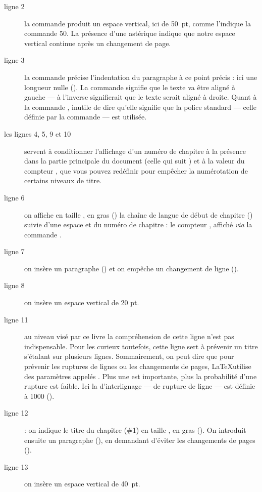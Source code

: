 \begin{description}
\item[ligne 2]la commande   produit un espace vertical, ici de 50~pt, comme l'indique la commande 50. La présence d'une astérique indique que notre espace vertical continue après un changement de page.
\item[ligne 3]la commande  précise l'indentation du paragraphe à ce point précis : ici une longueur nulle (). La commande  signifie que le texte va être aligné à gauche --- à l'inverse  signifierait que le texte serait aligné à droite. Quant à la commande , inutile de dire qu'elle signifie que la police standard --- celle définie par la commande  --- est utilisée.
\item[les lignes 4, 5, 9 et 10] servent à conditionner l'affichage d'un numéro de chapitre à la présence dans la partie principale du document (celle qui suit ) et à la valeur du compteur , que vous pouvez redéfinir pour empêcher la numérotation de certains niveaux de titre.
\item[ligne 6] on affiche en taille , en gras () la chaîne de langue de début de chapitre () suivie d'une espace et du numéro de chapitre : le compteur , affiché \emph{via} la commande .
\item[ligne 7] on insère un paragraphe () et on empêche un changement de ligne ().
\item[ligne 8] on insère un espace vertical de 20 pt.
\item[ligne 11] au niveau visé par ce livre la compréhension de cette ligne n'est pas indispensable. Pour les curieux toutefois, cette ligne sert à prévenir un titre s'étalant sur plusieurs lignes. Sommairement, on peut dire que pour prévenir les ruptures de lignes ou les changements de pages, \LaTeX utilise des paramètres appelés . Plus une  est importante, plus la probabilité d'une rupture est faible. Ici la  d'interlignage --- de rupture de ligne --- est définie à 1000 (). 
\item[ligne 12]: on indique le titre du chapitre (\#1) en taille , en gras (). On introduit ensuite un paragraphe (), en demandant d'éviter les changements de pages ().
\item[ligne 13]on insère un espace vertical de 40~pt.
\end{description}

